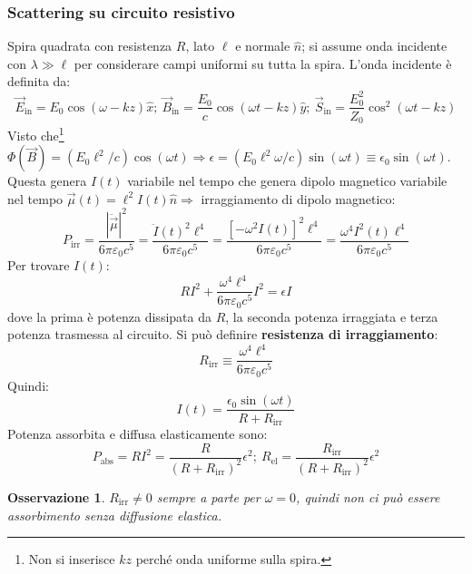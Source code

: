 \documentclass[10pt, a4paper]{scrartcl}
\numberwithin{equation}{subsection}
\theoremstyle{style1}
\newtheorem{osservazione}{Osservazione}[section]
\begin{document}
\subsubsection{Scattering su circuito resistivo}
Spira quadrata con resistenza $R$, lato $\ell $ e normale $\hat{n}$; si assume onda incidente con $\lambda \gg\ell $ per considerare campi uniformi su tutta la spira. L'onda incidente \`e definita da:
\[
\vec{E}_\text{in} = E_0 \cos(\omega - kz) \hat{x}; \ \vec{B}_\text{in} = \frac{E_0}{c} \cos(\omega t - kz) \hat{y} ; \ \vec{S}_\text{in} = \frac{E_0^2}{Z_0} \cos^2(\omega t- kz)
\] 
Visto che\footnote{Non si inserisce $kz$ perch\'e onda uniforme sulla spira.} $\Phi(\vec{B}) = (E_0 \ell ^2 / c) \cos(\omega t)\Rightarrow \epsilon = (E_0\ell ^2 \omega / c) \sin(\omega t)\equiv \epsilon _0 \sin (\omega t)$. Questa genera $I(t)$ variabile nel tempo che genera dipolo magnetico variabile nel tempo $\vec{\mu }(t) = \ell ^2I(t) \hat{n} \Rightarrow $ irraggiamento di dipolo magnetico:
\begin{equation}
	P_\text{irr}= \frac{|\ddot{\vec{\mu }}|^2}{6 \pi \varepsilon _0 c^5} = \frac{\ddot{I}(t) ^2 \ell ^4}{6\pi \varepsilon _0 c^5} = \frac{\left[ -\omega^2 I(t) \right] ^2\ell ^4}{6\pi\varepsilon _0 c^5} = \frac{\omega^4 I^2(t) \ell ^4}{6\pi \varepsilon _0 c^5}
\end{equation}
Per trovare $I(t)$:
\begin{equation}
	RI^2 + \frac{\omega^4 \ell ^4}{6\pi \varepsilon _0 c^5} I^2 = \epsilon I
\end{equation}
dove la prima \`e potenza dissipata da $R$, la seconda potenza irraggiata e terza potenza trasmessa al circuito. Si pu\`o definire \textbf{resistenza di irraggiamento}:
\begin{equation}
	R_\text{irr} \equiv \frac{\omega^4 \ell ^4}{6\pi \varepsilon _0 c^5}
\end{equation}
Quindi:
\begin{equation}
	I(t) = \frac{\epsilon_0 \sin(\omega t)}{R+R_\text{irr}}
\end{equation}
Potenza assorbita e diffusa elasticamente sono:
\begin{equation}
	P_\text{abs}= RI^2 =\frac{R}{(R+R_\text{irr})^2}\epsilon ^2; \ R_\text{el} = \frac{R_\text{irr}}{(R+R_\text{irr})^2} \epsilon ^2
\end{equation}
\begin{osservazione}
	$R_\text{irr}\neq 0$ sempre a parte per $\omega = 0$, quindi non ci pu\`o essere assorbimento senza diffusione elastica.
\end{osservazione}
\end{document}
